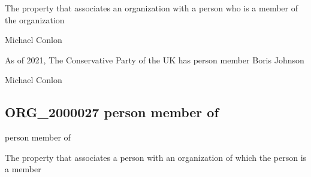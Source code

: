 \documentclass[letterpaper,10pt,english]{sphinxmanual}
\begin{document}
\begin{sphinxShadowBox}

\sphinxAtStartPar
The property that associates an organization with a person who is  a member of the organization
\end{sphinxShadowBox}

\begin{sphinxShadowBox}

\sphinxAtStartPar
Michael Conlon 
\end{sphinxShadowBox}

\begin{sphinxShadowBox}

\sphinxAtStartPar
As of 2021, The Conservative Party of the UK has person member Boris Johnson
\end{sphinxShadowBox}

\begin{sphinxShadowBox}

\sphinxAtStartPar
Michael Conlon 
\end{sphinxShadowBox}
\begin{quote}

\ignorespaces \end{quote}


\subsection{ORG\_2000027 \sphinxhyphen{} person member of}
\label{\detokenize{doc-ORG_2000027:org-2000027-person-member-of}}\label{\detokenize{doc-ORG_2000027:index-0}}\label{\detokenize{doc-ORG_2000027::doc}}
\begin{sphinxShadowBox}

\sphinxAtStartPar
person member of
\end{sphinxShadowBox}

\begin{sphinxShadowBox}

\sphinxAtStartPar
The property that associates a person with an organization of which the person is a member
\end{sphinxShadowBox}
\end{document}
